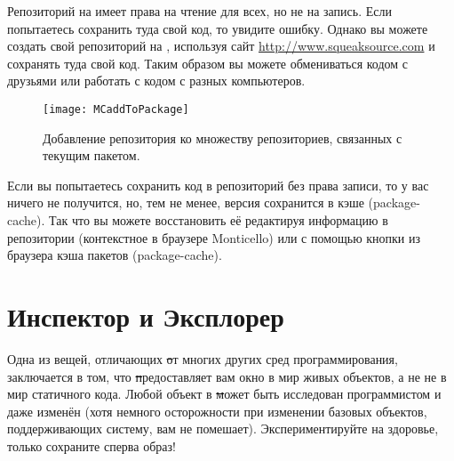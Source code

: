 \documentclass[a4paper,10pt,twoside]{book}
\begin{document}
Репозиторий  на \emphind{\sqsrc} имеет права на чтение для всех, но не на запись. Если попытаетесь сохранить туда свой код, то увидите ошибку. Однако вы можете создать свой репозиторий на \sqsrc, используя сайт \url{http://www.squeaksource.com} и сохранять туда свой код. Таким образом вы можете обмениваться кодом с друзьями или работать с кодом с разных компьютеров.

\begin{figure}[tbp]
	\begin{center}
		\texttt{[image: MCaddToPackage]}
	\end{center}
	\caption{Добавление репозитория ко множеству репозиториев, связанных с текущим пакетом.}
\end{figure}


Если вы попытаетесь сохранить код в репозиторий без права записи, то у вас ничего не получится, но, тем не менее, версия сохранится в кэше (package-cache). Так что вы можете восстановить её редактируя информацию в репозитории (контекстное в браузере Monticello) или с помощью кнопки  из браузера кэша пакетов (package-cache).

\section{Инспектор и Эксплорер}

Одна из вещей, отличающих \st от многих других сред программирования, заключается в том, что \st предоставляет вам окно в мир живых объектов, а не не в мир статичного кода.
Любой объект в \st может быть исследован программистом и даже изменён (хотя немного осторожности при изменении базовых объектов, поддерживающих систему, вам не помешает).
Экспериментируйте на здоровье, только сохраните сперва образ!
\end{document}
